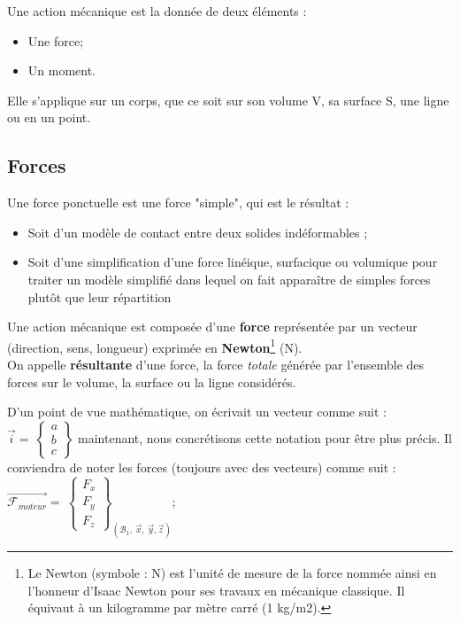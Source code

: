 \documentclass[
	11pt, %
	fleqn, %
	a4paper, %
]{LegrandOrangeBook}
\begin{document}
\begin{theorem}
    Une action mécanique est la donnée de deux éléments :
    \begin{itemize}
        \item Une force;
        \item Un moment.
    \end{itemize}
Elle s’applique sur un corps, que ce soit sur son volume V, sa surface S, une ligne ou en un point.
\end{theorem}







\subsection{Forces}
Une force ponctuelle est une force "simple", qui est le résultat :
\begin{itemize}
    \item Soit d’un modèle de contact entre deux solides indéformables ;
    \item Soit d’une simplification d’une force linéique, surfacique ou volumique pour traiter un modèle
simplifié dans lequel on fait apparaître de simples forces plutôt que leur répartition
\end{itemize}

Une action mécanique est composée d’une \textbf{force} représentée par un vecteur (direction, sens, longueur) exprimée en \textbf{Newton}\footnote{Le Newton (symbole : N) est l'unité de mesure de la force nommée ainsi en l'honneur d'Isaac Newton pour ses travaux en mécanique classique. Il équivaut à un kilogramme par mètre carré (1 kg/m2).} (N). \\
On appelle \textbf{résultante} d’une force, la force \textit{totale} générée par l’ensemble des forces sur le volume, la surface ou la ligne considérés.


D'un point de vue mathématique, on écrivait un vecteur comme suit : $\Vec{i}=\ \begin{Bmatrix} a\\ b \\ c \end{Bmatrix} $  maintenant, nous concrétisons cette notation pour être plus précis. Il conviendra de noter les forces (toujours avec des vecteurs) comme suit : 
 {$\overrightarrow{\mathcal{F}_{moteur}} =\ \begin{Bmatrix}
F_{x}\\
F_{y}\\
F_{z}
\end{Bmatrix}_{( \mathcal{B}_{1} ,\ \vec{x} ,\ \vec{y} ,\vec{z})}$};
\end{document}
